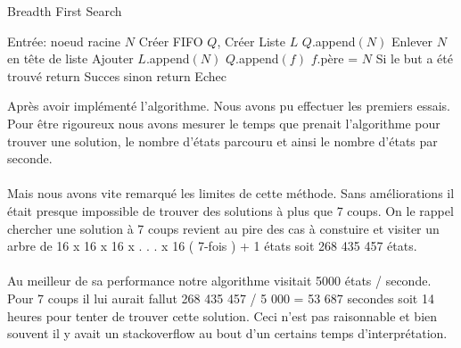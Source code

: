 \documentclass{article}
\begin{document}
\begin{algorithm}
\caption{Breadth First Search}
\label{alg:bfs-reach}
\begin{algorithmic}[1]
  \STATE Entrée: noeud racine $N$
  \STATE Créer FIFO $Q$, Créer Liste $L$
  \STATE $Q$.append$(N)$
    \STATE Enlever $N$ en tête de liste
    \STATE Ajouter $L$.append$(N)$
      \STATE $Q$.append$(f)$
      \STATE $f$.père = $N$
    \ENDFOR
  \ENDWHILE
  \STATE Si le but a été trouvé return Succes sinon return Echec

\end{algorithmic}
\end{algorithm}
Après avoir implémenté l'algorithme. Nous avons pu effectuer les premiers essais. Pour être rigoureux nous avons mesurer le temps que prenait l'algorithme pour trouver une solution, le nombre d'états parcouru et ainsi le nombre d'états par seconde.
\\\\
Mais nous avons vite remarqué les limites de cette méthode. Sans améliorations il était presque impossible de trouver des solutions à plus que 7 coups. On le rappel chercher une solution à 7 coups revient au pire des cas à constuire et visiter un arbre de 16 x 16 x 16 x . . . x 16 ( 7-fois ) + 1 états soit 268 435 457 états.\\\\
Au meilleur de sa performance notre algorithme visitait 5000 états / seconde. Pour 7 coups il lui aurait fallut 268 435 457 / 5 000 = 53 687 secondes soit 14 heures pour tenter de trouver cette solution. Ceci n'est pas raisonnable et bien souvent il y avait un stackoverflow au bout d'un certains temps d'interprétation.
\end{document}
